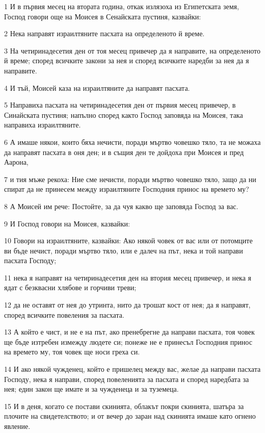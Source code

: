 \par 1 И в първия месец на втората година, откак излязоха из Египетската земя, Господ говори още на Моисея в Сенайската пустиня, казвайки:
\par 2 Нека направят израилтяните пасхата на определеното й време.
\par 3 На четиринадесетия ден от тоя месец привечер да я направите, на определеното й време; според всичките закони за нея и според всичките наредби за нея да я направите.
\par 4 И тъй, Моисей каза на израилтяните да направят пасхата.
\par 5 Направиха пасхата на четиринадесетия ден от първия месец привечер, в Синайската пустиня; напълно според както Господ заповяда на Моисея, така направиха израилтяните.
\par 6 А имаше някои, които бяха нечисти, поради мъртво човешко тяло, та не можаха да направят пасхата в оня ден; и в същия ден те дойдоха при Моисея и пред Аарона,
\par 7 и тия мъже рекоха: Ние сме нечисти, поради мъртво човешко тяло, защо да ни спират да не принесем между израилтяните Господния принос на времето му?
\par 8 А Моисей им рече: Постойте, за да чуя какво ще заповяда Господ за вас.
\par 9 И Господ говори на Моисея, казвайки:
\par 10 Говори на израилтяните, казвайки: Ако някой човек от вас или от потомците ви бъде нечист, поради мъртво тяло, или е далеч на път, нека и той направи пасхата Господу;
\par 11 нека я направят на четиринадесетия ден на втория месец привечер, и нека я ядат с безквасни хлябове и горчиви треви;
\par 12 да не оставят от нея до утринта, нито да трошат кост от нея; да я направят, според всичките повеления за пасхата.
\par 13 А който е чист, и не е на път, ако пренебрегне да направи пасхата, тоя човек ще бъде изтребен измежду людете си; понеже не е принесъл Господния принос на времето му, тоя човек ще носи греха си.
\par 14 И ако някой чужденец, който е пришелец между вас, желае да направи пасхата Господу, нека я направи, според повеленията за пасхата и според наредбата за нея; един закон ще имате и за чужденеца и за туземеца.
\par 15 И в деня, когато се постави скинията, облакът покри скинията, шатъра за плочите на свидетелството; и от вечер до заран над скинията имаше като огнено явление.
